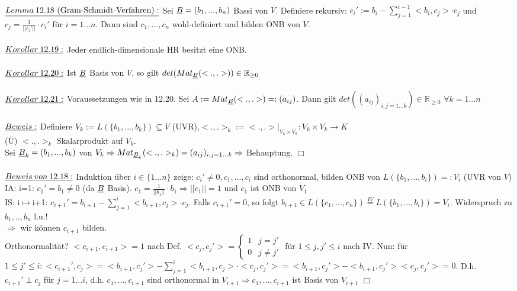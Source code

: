 \documentclass[fleqn, a4paper, 11pt]{scrartcl}
\newcommand{\RR}{\mathbb{R}}
\theoremstyle{definition}
\begin{document}
\\
$\uline{Lemma\:12.18\text{ (Gram-Schmidt-Verfahren)}:}$ Sei $\uline{B}=(b_1,...,b_n)$ Bassi von $V$. Definiere rekursiv: $c_i':=b_i-\sum\limits_{j=1}^{i-1} <b_i,c_j>\cdot c_j$ und $c_j=\tfrac{1}{||c_i'||}\cdot c_i'$ für $i=1...n$. Dann sind $c_1,...,c_n$ wohl-definiert und bilden ONB von $V$.\\
\\
$\uline{Korollar\:12.19:}$ Jeder endlich-dimensionale HR besitzt eine ONB.\\
\\
$\uline{Korollar\:12.20:}$ Ist $\uline{B}$ Basis von $V$, so gilt $det(Mat_{\uline{B}}(<.,.>))\in\RR_{\geq 0}$\\
\\
$\uline{Korollar\:12.21:}$ Voraussetzungen wie in 12.20. Sei $A:=Mat_{\uline{B}}(<.,.>)=:(a_{ij})$. Dann gilt $det((a_{ij})_{i,j=1...k})\in\RR_{\geq 0}$ $\forall k=1...n$\\
\\
$\uline{Beweis:}$ Definiere $V_k:=L(\{b_1,...,b_k\})\subseteq V$ (UVR),$<.,.>_k :=<.,.>|_{V_k\times V_k}:V_k\times V_k\rightarrow K$\\
(\"U) $<.,.>_k$ Skalarprodukt auf $V_k$.\\
Sei $\uline{B}_k=(b_1,...,b_k)$ von $V_k\Rightarrow Mat_{\uline{B}_k}(<.,.>_k)=(a_{ij})_{i,j=1...k}\Rightarrow$ Behauptung. \hfill $\Box$\\
\\
$\uline{Beweis\:von\:12.18:}$ Induktion über $i\in\{1...n\}$ zeige: $c_i'\neq 0,c_1,...,c_i$ sind orthonormal, bilden ONB von $L(\{b_1,...,b_i\})=:V_i$ (UVR von $V$)\\
IA: i=1: $c_1'=b_1\neq 0$ (da $\uline{B}$ Basis). $c_1=\tfrac{1}{||b_1||}\cdot b_1\Rightarrow ||c_1||=1$ und $c_1$ ist ONB von $V_1$\\
IS: i$\mapsto$i+1: $c_{i+1}'=b_{i+1}-\sum\limits_{j=1}^i <b_{i+1},c_j>\cdot c_j$. Falls $c_{i+1}'=0$, so folgt $b_{i+1}\in L(\{c_1,...,c_n\})\stackrel{IV}{=}L(\{b_1,...,b_i\})=V_i$. Widerspruch zu $b_1,..,b_n$ l.u.!\\
$\Rightarrow$ wir können $c_{i+1}$ bilden.\\
Orthonormalität? $<c_{i+1},c_{i+1}>=1$ nach Def. $<c_j,c_j'>=\begin{cases}
	1 & j=j'\\
	0 & j\neq j'
\end{cases}$ für $1\leq j,j'\leq i$ nach IV. Nun: für $1\leq j'\leq i:<c_{i+1}',c_j>=<b_{i+1},c_j'>-\sum\limits_{j=1}^i <b_{i+1},c_j>\cdot <c_j,c_j'>=<b_{i+1},c_j'>-<b_{i+1},c_j'><c_j,c_j'>=0$. D.h. $c_{i+1}'\perp c_j$ für $j=1...i$, d.h. $c_1,...,c_{i+1}$ sind orthonormal in $V_{i+1}\Rightarrow c_1,...,c_{i+1}$ ist Basis von $V_{i+1}$ \hfill $\Box$\\
\end{document}
